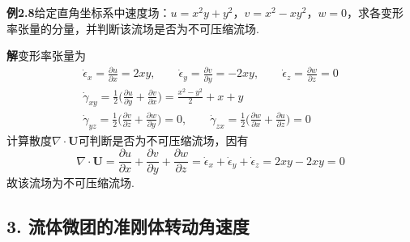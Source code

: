 \noindent\textbf{例2.8}\quad 给定直角坐标系中速度场：$u=x^{2}y+y^{2}$，$v=x^{2}-xy^{2}$，$w=0$，求各变形率张量的分量，并判断该流场是否为不可压缩流场.

\noindent\textbf{解}\quad 变形率张量为
\begin{gather*}
\dot{\epsilon}_x=\frac{\partial u}{\partial x}=2xy,\qquad \dot{\epsilon}_y=\frac{\partial v}{\partial y}=-2xy,\qquad \dot{\epsilon}_z=\frac{\partial w}{\partial z}=0\\[4pt]
\dot{\gamma}_{xy}=\frac{1}{2}\Big(\frac{\partial u}{\partial y}+\frac{\partial v}{\partial x}\Big)=\frac{x^{2}-y^{2}}{2}+x+y\\[4pt]
\dot{\gamma}_{yz}=\frac{1}{2}\Big(\frac{\partial v}{\partial z}+\frac{\partial w}{\partial y}\Big)=0,\qquad
\dot{\gamma}_{zx}=\frac{1}{2}\Big(\frac{\partial w}{\partial x}+\frac{\partial u}{\partial z}\Big)=0
\end{gather*}
计算散度$\nabla\cdot\boldsymbol{U}$可判断是否为不可压缩流场，因有
\[
\nabla\cdot\boldsymbol{U}=\frac{\partial u}{\partial x}+\frac{\partial v}{\partial y}+\frac{\partial w}{\partial z}=\dot{\epsilon}_x+\dot{\epsilon}_y+\dot{\epsilon}_z=2xy-2xy=0
\]
故该流场为不可压缩流场.
\subsection*{3. 流体微团的准刚体转动角速度}

